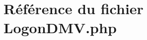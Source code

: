 \hypertarget{LogonDMV_8php}{
\section{R\'{e}f\'{e}rence du fichier Logon\-DMV.php}
\label{LogonDMV_8php}
}
